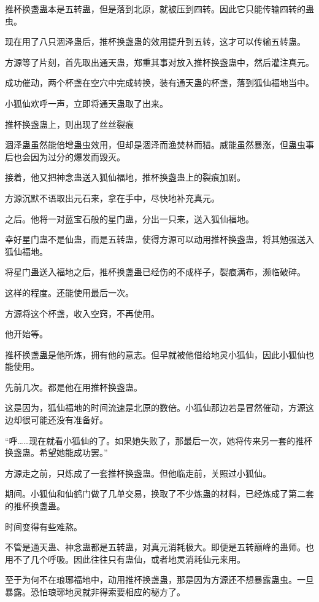 \begin{this_body}
推杯换盏蛊本是五转蛊，但是落到北原，就被压到四转。因此它只能传输四转的蛊虫。

现在用了八只涸泽蛊后，推杯换盏蛊的效用提升到五转，这才可以传输五转蛊。

方源等了片刻，首先取出通天蛊，郑重其事对放入推杯换盏蛊中，然后灌注真元。

成功催动，两个杯盏在空穴中完成转换，装有通天蛊的杯盏，落到狐仙福地当中。

小狐仙欢呼一声，立即将通天蛊取了出来。

推杯换盏蛊上，则出现了丝丝裂痕

涸泽蛊虽然能倍增蛊虫效用，但却是涸泽而渔焚林而猎。威能虽然暴涨，但蛊虫事后也会因为过分的爆发而毁灭。

接着，他又把神念蛊送入狐仙福地，推杯换盏蛊上的裂痕加剧。

方源沉默不语取出元石来，拿在手中，尽快地补充真元。

之后。他将一对蓝宝石般的星门蛊，分出一只来，送入狐仙福地。

幸好星门蛊不是仙蛊，而是五转蛊，使得方源可以动用推杯换盏蛊，将其勉强送入狐仙福地。

将星门蛊送入福地之后，推杯换盏蛊已经伤的不成样子，裂痕满布，濒临破碎。

这样的程度。还能使用最后一次。

方源将这个杯盏，收入空窍，不再使用。

他开始等。

推杯换盏蛊是他所炼，拥有他的意志。但早就被他借给地灵小狐仙，因此小狐仙也能使用。

先前几次。都是他在用推杯换盏蛊。

这是因为，狐仙福地的时间流速是北原的数倍。小狐仙那边若是冒然催动，方源这边却很可能还没有准备好。

“呼……现在就看小狐仙的了。如果她失败了，那最后一次，她将传来另一套的推杯换盏蛊。希望她能成功罢。”

方源走之前，只炼成了一套推杯换盏蛊。但他临走前，关照过小狐仙。

期间。小狐仙和仙鹤门做了几单交易，换取了不少炼蛊的材料，已经炼成了第二套的推杯换盏蛊。

时间变得有些难熬。

不管是通天蛊、神念蛊都是五转蛊，对真元消耗极大。即便是五转巅峰的蛊师。也用不了几个呼吸。因此往往只有蛊仙，或者地灵消耗仙元来用。

至于为何不在琅琊福地中，动用推杯换盏蛊，那是因为方源还不想暴露蛊虫。一旦暴露。恐怕琅琊地灵就非得索要相应的秘方了。


\end{this_body}
